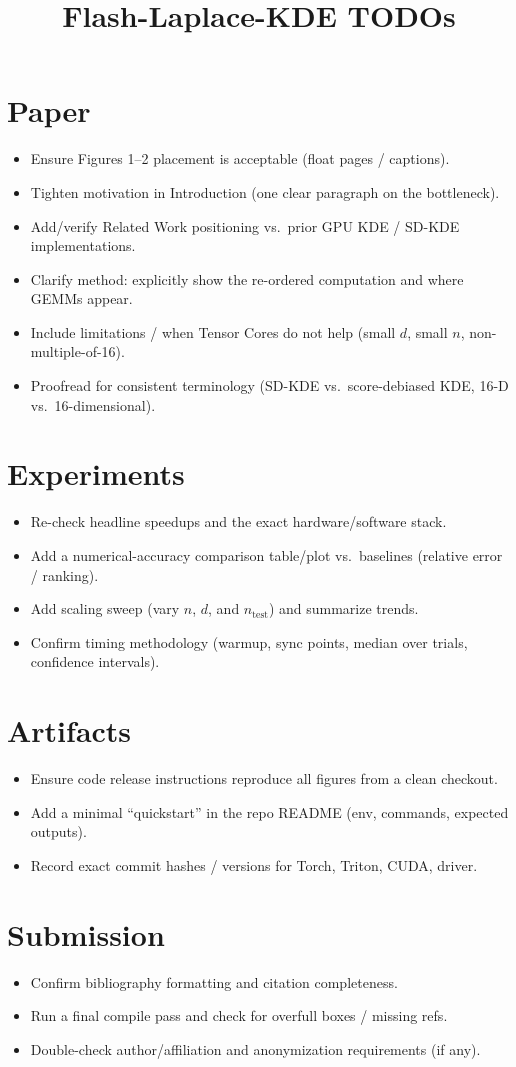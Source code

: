 \documentclass[11pt]{article}
\title{Flash-Laplace-KDE TODOs}
\author{}
\date{}
\newcommand{\todo}{\item[$\square$]}
\begin{document}
\maketitle

\section*{Paper}
\begin{itemize}
  \todo Ensure Figures 1--2 placement is acceptable (float pages / captions).
  \todo Tighten motivation in Introduction (one clear paragraph on the bottleneck).
  \todo Add/verify Related Work positioning vs.\ prior GPU KDE / SD-KDE implementations.
  \todo Clarify method: explicitly show the re-ordered computation and where GEMMs appear.
  \todo Include limitations / when Tensor Cores do not help (small $d$, small $n$, non-multiple-of-16).
  \todo Proofread for consistent terminology (SD-KDE vs.\ score-debiased KDE, 16-D vs.\ 16-dimensional).
\end{itemize}

\section*{Experiments}
\begin{itemize}
  \todo Re-check headline speedups and the exact hardware/software stack.
  \todo Add a numerical-accuracy comparison table/plot vs.\ baselines (relative error / ranking).
  \todo Add scaling sweep (vary $n$, $d$, and $n_{\text{test}}$) and summarize trends.
  \todo Confirm timing methodology (warmup, sync points, median over trials, confidence intervals).
\end{itemize}

\section*{Artifacts}
\begin{itemize}
  \todo Ensure code release instructions reproduce all figures from a clean checkout.
  \todo Add a minimal ``quickstart'' in the repo README (env, commands, expected outputs).
  \todo Record exact commit hashes / versions for Torch, Triton, CUDA, driver.
\end{itemize}

\section*{Submission}
\begin{itemize}
  \todo Confirm bibliography formatting and citation completeness.
  \todo Run a final compile pass and check for overfull boxes / missing refs.
  \todo Double-check author/affiliation and anonymization requirements (if any).
\end{itemize}
\end{document}

